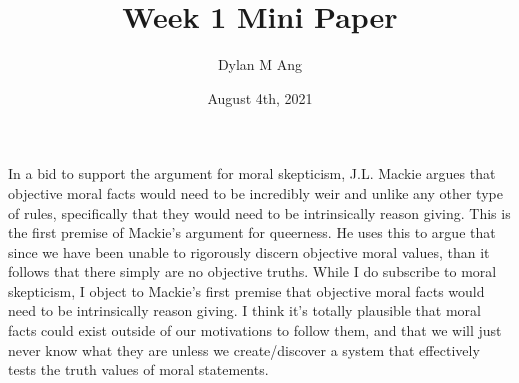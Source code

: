 \documentclass[12pt]{article}
\title{Week 1 Mini Paper}
\author{Dylan M Ang}
\date{August 4th, 2021}
\begin{document}
\maketitle

In a bid to support the argument for moral skepticism, J.L. Mackie argues that objective moral facts would need to be incredibly weir and unlike any other type of rules, specifically that they would need to be intrinsically reason giving.
This is the first premise of Mackie's argument for queerness. He uses this to argue that since we have been unable to rigorously discern objective moral values, than it follows that there simply are no objective truths.
While I do subscribe to moral skepticism, I object to Mackie's first premise that objective moral facts would need to be intrinsically reason giving. I think it's totally plausible that moral facts could exist outside of our motivations to follow them, and that we will just never know what they are unless we create/discover a system that effectively tests the truth values of moral statements.
\end{document}
